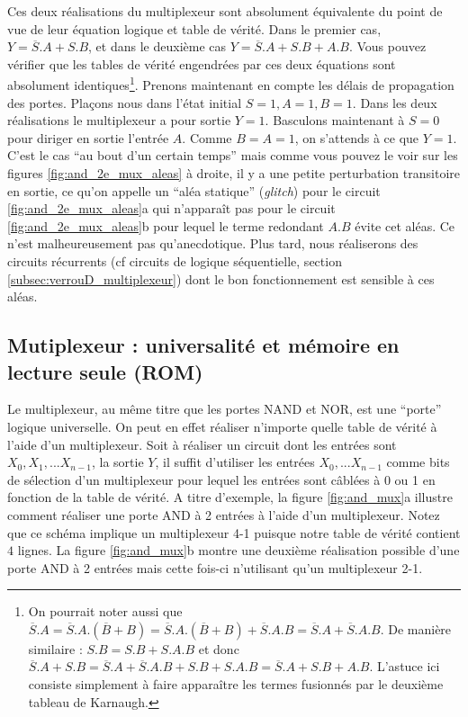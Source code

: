 Ces deux réalisations du multiplexeur sont absolument équivalente du point de vue de leur équation logique et table de vérité. Dans le premier cas, $Y = \overline{S}.A + S. B$, et dans le deuxième cas $Y = \overline{S}.A + S.B + A.B$. Vous pouvez vérifier que les tables de vérité engendrées par ces deux équations sont absolument identiques\footnote{On pourrait noter aussi que $\overline{S}.A = \overline{S}.A.(\overline{B} + B) = \overline{S}.A.(\overline{B} + B) + \overline{S}.A.B = \overline{S}.A + \overline{S}.A.B$. De manière similaire : $S.B = S.B + S.A.B$ et donc $\overline{S}.A + S.B = \overline{S}.A + \overline{S}.A.B + S.B + S.A.B = \overline{S}.A + S.B + A.B$. L'astuce ici consiste simplement à faire apparaître les termes fusionnés par le deuxième tableau de Karnaugh.}. Prenons maintenant en compte les délais de propagation des portes. Plaçons nous dans l'état initial $S=1, A=1, B=1$. Dans les deux réalisations le multiplexeur a pour sortie $Y=1$. Basculons maintenant à $S=0$ pour diriger en sortie l'entrée $A$. Comme $B=A=1$, on s'attends à ce que $Y=1$. C'est le cas ``au bout d'un certain temps'' mais comme vous pouvez le voir sur les figures \ref{fig:and_2e_mux_aleas} à droite, il y a une petite perturbation transitoire en sortie, ce qu'on appelle un ``aléa statique'' (\emph{glitch}) pour le circuit \ref{fig:and_2e_mux_aleas}a qui n'apparaît pas pour le circuit \ref{fig:and_2e_mux_aleas}b pour lequel le terme redondant $A.B$ évite cet aléas. Ce n'est malheureusement pas qu'anecdotique. Plus tard, nous réaliserons des circuits récurrents (cf circuits de logique séquentielle, section \ref{subsec:verrouD_multiplexeur}) dont le bon fonctionnement est sensible à ces aléas. 


\subsection{Mutiplexeur : universalité et mémoire en lecture seule (ROM)}

Le multiplexeur, au même titre que les portes NAND et NOR, est une ``porte'' logique universelle. On peut en effet réaliser n'importe quelle table de vérité à l'aide d'un multiplexeur. Soit à réaliser un circuit dont les entrées sont $X_0, X_1, ... X_{n-1}$, la sortie $Y$, il suffit d'utiliser les entrées $X_0, ... X_{n-1}$ comme bits de sélection d'un multiplexeur pour lequel les entrées sont câblées à 0 ou 1 en fonction de la table de vérité. A titre d'exemple, la figure \ref{fig:and_mux}a illustre comment réaliser une porte AND à 2 entrées à l'aide d'un multiplexeur. Notez que ce schéma implique un multiplexeur 4-1 puisque notre table de vérité contient $4$ lignes. La figure \ref{fig:and_mux}b montre une deuxième réalisation possible d'une porte AND à 2 entrées mais cette fois-ci n'utilisant qu'un multiplexeur 2-1.

